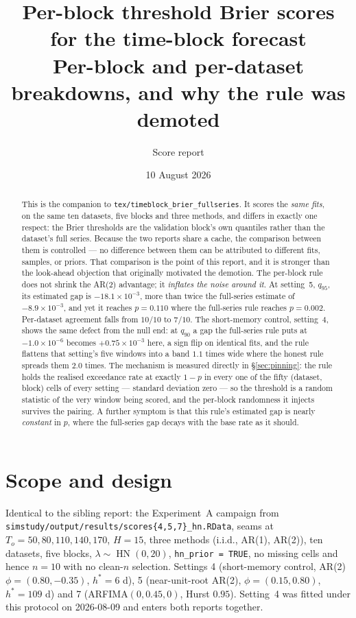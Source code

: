 \documentclass[11pt]{article}
\title{\textbf{Per-block threshold Brier scores for the time-block
forecast}\\[2pt]
\large Per-block and per-dataset breakdowns, and why the rule was
demoted}
\author{Score report}
\date{10 August 2026}
\newcommand{\code}[1]{\texttt{#1}}
\DeclareMathOperator{\hn}{HN}
\begin{document}
\maketitle

\begin{abstract}
This is the companion to \code{tex/timeblock\_brier\_fullseries}. It
scores the \emph{same fits}, on the same ten datasets, five blocks and
three methods, and differs in exactly one respect: the Brier thresholds
are the validation block's own quantiles rather than the dataset's full
series. Because the two reports share a cache, the comparison between
them is controlled --- no difference between them can be attributed to
different fits, samples, or priors. That comparison is the point of this
report, and it is stronger than the look-ahead objection that originally
motivated the demotion. The per-block rule does not shrink the AR(2)
advantage; it \emph{inflates the noise around it}. At setting~5,
$q_{95}$, its estimated gap is $-18.1 \times 10^{-3}$, more than twice
the full-series estimate of $-8.9 \times 10^{-3}$, and yet it reaches
$p = 0.110$ where the full-series rule reaches $p = 0.002$. Per-dataset
agreement falls from $10/10$ to $7/10$. The short-memory control,
setting~4, shows the same defect from the null end: at $q_{90}$ a gap the
full-series rule puts at $-1.0 \times 10^{-6}$ becomes
$+0.75 \times 10^{-3}$ here, a sign flip on identical fits, and the rule
flattens that setting's five
windows into a band $1.1$ times wide where the honest rule spreads them
$2.0$ times. The mechanism is measured directly in \S\ref{sec:pinning}:
the rule holds the realised exceedance rate at exactly $1-p$ in every one
of the fifty (dataset, block) cells of every setting --- standard
deviation zero --- so the threshold is a random statistic of the very
window being scored, and the per-block randomness it injects survives the
pairing. A further symptom is that this rule's estimated gap is nearly
\emph{constant} in $p$, where the full-series gap decays with the base
rate as it should.
\end{abstract}

\section{Scope and design}

Identical to the sibling report: the Experiment~A campaign from
\code{simstudy/output/results/scores\{4,5,7\}\_hn.RData}, seams at
$T_o = 50, 80, 110, 140, 170$, $H = 15$, three methods (i.i.d., AR(1),
AR(2)), ten datasets, five blocks, $\lambda \sim \hn(0, 20)$,
\code{hn\_prior = TRUE}, no missing cells and hence $n = 10$ with no
clean-$n$ selection. Settings 4 (short-memory control, AR(2)
$\phi = (0.80, -0.35)$, $h^\ast = 6$ d), 5 (near-unit-root AR(2),
$\phi = (0.15, 0.80)$, $h^\ast = 109$ d) and 7 (ARFIMA$(0, 0.45, 0)$,
Hurst $0.95$). Setting~4 was fitted under this protocol on 2026-08-09 and
enters both reports together.
\end{document}
